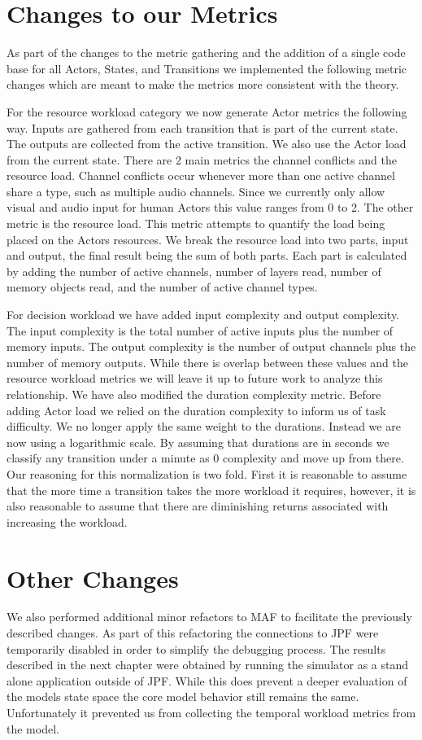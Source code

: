 \section{Changes to our Metrics}

As part of the changes to the metric gathering and the addition of a single code base for all Actors, States, and Transitions we implemented the following metric changes which are meant to make the metrics more consistent with the theory.

For the resource workload category we now generate Actor metrics the following way.  Inputs are gathered from each transition that is part of the current state.  The outputs are collected from the active transition.  We also use the Actor load from the current state.  There are 2 main metrics the channel conflicts and the resource load.  Channel conflicts occur whenever more than one active channel share a type, such as multiple audio channels.  Since we currently only allow visual and audio input for human Actors this value ranges from 0 to 2.  The other metric is the resource load.  This metric attempts to quantify the load being placed on the Actors resources.  We break the resource load into two parts, input and output, the final result being the sum of both parts.  Each part is calculated by adding the number of active channels, number of layers read, number of memory objects read, and the number of active channel types.

For decision workload we have added input complexity and output complexity.  The input complexity is the total number of active inputs plus the number of memory inputs.  The output complexity is the number of output channels plus the number of memory outputs.  While there is overlap between these values and the resource workload metrics we will leave it up to future work to analyze this relationship.  We have also modified the duration complexity metric.  Before adding Actor load we relied on the duration complexity to inform us of task difficulty.  We no longer apply the same weight to the durations.  Instead we are now using a logarithmic scale.  By assuming that durations are in seconds we classify any transition under a minute as 0 complexity and move up from there.  Our reasoning for this normalization is two fold.  First it is reasonable to assume that the more time a transition takes the more workload it requires, however, it is also reasonable to assume that there are diminishing returns associated with increasing the workload.


\section{Other Changes}
We also performed additional minor refactors to MAF to facilitate the previously described changes.  As part of this refactoring the connections to JPF were temporarily disabled in order to simplify the debugging process.  The results described in the next chapter were obtained by running the simulator as a stand alone application outside of JPF.  While this does prevent a deeper evaluation of the models state space the core model behavior still remains the same.  Unfortunately it prevented us from collecting the temporal workload metrics from the model.
